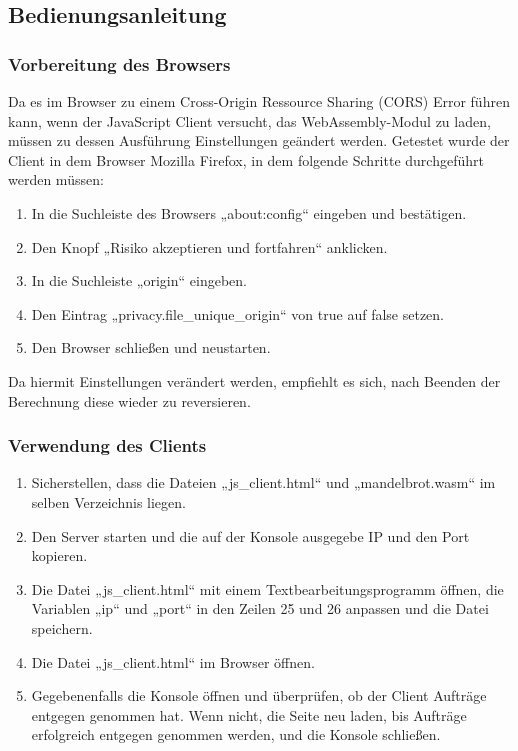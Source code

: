 \documentclass[12pt, onecolumn, notitlepage]{scrartcl}
\begin{document}
\subsection{Bedienungsanleitung}
\subsubsection{Vorbereitung des Browsers}
Da es im Browser zu einem Cross-Origin Ressource Sharing (CORS) Error führen kann, wenn der JavaScript Client versucht, das WebAssembly-Modul zu laden, müssen zu dessen Ausführung Einstellungen geändert werden. Getestet wurde der Client in dem Browser Mozilla Firefox, in dem folgende Schritte durchgeführt werden müssen:
\begin{enumerate}
	\setlength\itemsep{0.07em}
	\item In die Suchleiste des Browsers „about:config“ eingeben und bestätigen.
	\item Den Knopf „Risiko akzeptieren und fortfahren“ anklicken.
	\item In die Suchleiste „origin“ eingeben.
	\item Den Eintrag „privacy.file\_unique\_origin“ von true auf false setzen.
	\item Den Browser schließen und neustarten.
\end{enumerate}
Da hiermit Einstellungen verändert werden, empfiehlt es sich, nach Beenden der Berechnung diese wieder zu reversieren.
\subsubsection{Verwendung des Clients}
\begin{enumerate}
	\setlength\itemsep{0.07em}
	\item Sicherstellen, dass die Dateien „js\_client.html“ und „mandelbrot.wasm“ im selben Verzeichnis liegen.
	\item Den Server starten und die auf der Konsole ausgegebe IP und den Port kopieren.
	\item Die Datei „js\_client.html“ mit einem Textbearbeitungsprogramm öffnen, die Variablen „ip“ und „port“ in den Zeilen 25 und 26 anpassen und die Datei speichern.
	\item Die Datei „js\_client.html“ im Browser öffnen.
	\item Gegebenenfalls die Konsole öffnen und überprüfen, ob der Client Aufträge entgegen genommen hat. Wenn nicht, die Seite neu laden, bis Aufträge erfolgreich entgegen genommen werden, und die Konsole schließen.
\end{enumerate}
\end{document}
